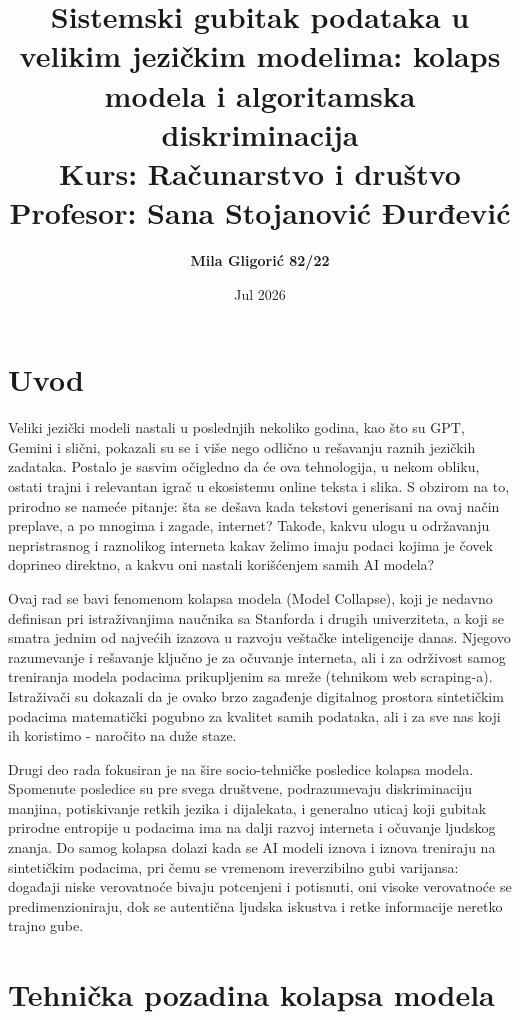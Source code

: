 \documentclass[12pt]{article}
\title{\textbf{Sistemski gubitak podataka u velikim jezičkim modelima: kolaps modela i algoritamska diskriminacija}\\[0.8cm] 
	\large Kurs: Računarstvo i društvo \\[0.3cm] 
	\large Profesor: Sana Stojanović Đurđević}
\author{\textbf{Mila Gligorić 82/22}}
\date{Jul 2026}
\begin{document}
	
	\maketitle
	\newpage
	
	\tableofcontents
	\newpage
	
	\section{Uvod}
	
	Veliki jezički modeli nastali u poslednjih nekoliko godina, kao što su GPT, Gemini i slični, pokazali su se i više nego odlično u rešavanju raznih jezičkih zadataka. Postalo je sasvim očigledno da će ova tehnologija, u nekom obliku, ostati trajni i relevantan igrač u ekosistemu online teksta i slika. S obzirom na to, prirodno se nameće pitanje: šta se dešava kada tekstovi generisani na ovaj način preplave, a po mnogima i zagade, internet? Takođe, kakvu ulogu u održavanju nepristrasnog i raznolikog interneta kakav želimo imaju podaci kojima je čovek doprineo direktno, a kakvu oni nastali korišćenjem samih AI modela?
	
	Ovaj rad se bavi fenomenom kolapsa modela (Model Collapse), koji je nedavno definisan pri istraživanjima naučnika sa Stanforda i drugih univerziteta, a koji se smatra jednim od najvećih izazova u razvoju veštačke inteligencije danas. Njegovo razumevanje i rešavanje ključno je za očuvanje interneta, ali i za održivost samog treniranja modela podacima prikupljenim sa mreže (tehnikom web scraping-a). Istraživači su dokazali da je ovako brzo zagađenje digitalnog prostora sintetičkim podacima matematički pogubno za kvalitet samih podataka, ali i za sve nas koji ih koristimo - naročito na duže staze.
	
	Drugi deo rada fokusiran je na šire socio-tehničke posledice kolapsa modela. Spomenute posledice su pre svega društvene, podrazumevaju diskriminaciju manjina, potiskivanje retkih jezika i dijalekata, i generalno uticaj koji gubitak prirodne entropije u podacima ima na dalji razvoj interneta i očuvanje ljudskog znanja. Do samog kolapsa dolazi kada se AI modeli iznova i iznova treniraju na sintetičkim podacima, pri čemu se vremenom ireverzibilno gubi varijansa: događaji niske verovatnoće bivaju potcenjeni i potisnuti, oni visoke verovatnoće se predimenzioniraju, dok se autentična ljudska iskustva i retke informacije neretko trajno gube.
	
	\section{Tehnička pozadina kolapsa modela}
	
\end{document}
